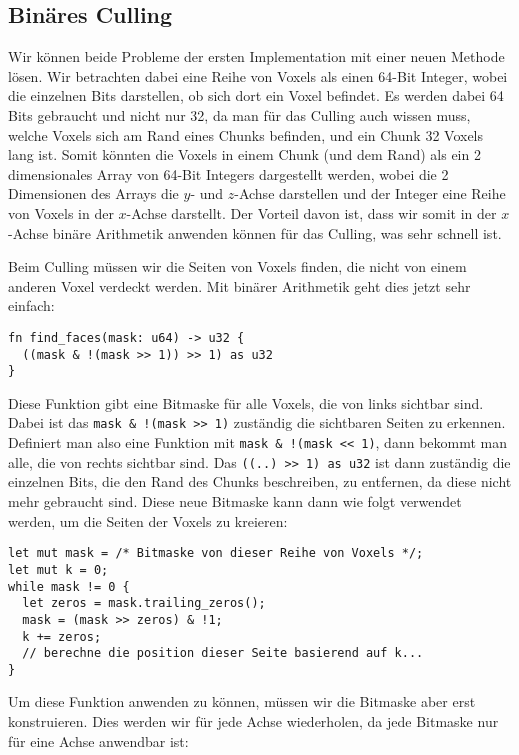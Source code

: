 \subsection{Binäres Culling}

Wir können beide Probleme der ersten Implementation
mit einer neuen Methode lösen.
Wir betrachten dabei eine Reihe von Voxels als einen
64-Bit Integer, wobei die einzelnen Bits darstellen,
ob sich dort ein Voxel befindet.
Es werden dabei 64 Bits gebraucht und nicht nur 32,
da man für das Culling auch wissen muss,
welche Voxels sich am Rand eines Chunks befinden,
und ein Chunk 32 Voxels lang ist.
Somit könnten die Voxels in einem Chunk
(und dem Rand) als ein 2 dimensionales
Array von 64-Bit Integers dargestellt werden,
wobei die 2 Dimensionen des Arrays die
$y$- und $z$-Achse darstellen und der Integer eine
Reihe von Voxels in der $x$-Achse darstellt.
Der Vorteil davon ist, dass wir somit in der
$x$-Achse binäre Arithmetik anwenden können für
das Culling, was sehr schnell ist.

Beim Culling müssen wir die Seiten von
Voxels finden, die nicht von einem anderen Voxel
verdeckt werden.
Mit binärer Arithmetik geht dies jetzt sehr einfach:
\begin{verbatim}
fn find_faces(mask: u64) -> u32 {
  ((mask & !(mask >> 1)) >> 1) as u32
}
\end{verbatim}
Diese Funktion gibt eine Bitmaske für alle Voxels,
die von links sichtbar sind.
Dabei ist das \verb|mask & !(mask >> 1)| zuständig
die sichtbaren Seiten zu erkennen.
Definiert man also eine Funktion mit
\verb|mask & !(mask << 1)|, dann bekommt man alle,
die von rechts sichtbar sind.
Das \verb|((..) >> 1) as u32| ist dann zuständig
die einzelnen Bits, die den Rand des Chunks beschreiben,
zu entfernen, da diese nicht mehr gebraucht sind.
Diese neue Bitmaske kann dann wie folgt verwendet
werden, um die Seiten der Voxels zu kreieren:

\begin{verbatim}
let mut mask = /* Bitmaske von dieser Reihe von Voxels */;
let mut k = 0;
while mask != 0 {
  let zeros = mask.trailing_zeros();
  mask = (mask >> zeros) & !1;
  k += zeros;
  // berechne die position dieser Seite basierend auf k...
}
\end{verbatim}

Um diese Funktion anwenden zu können, müssen
wir die Bitmaske aber erst konstruieren.
Dies werden wir für jede Achse wiederholen,
da jede Bitmaske nur für eine Achse anwendbar ist:

